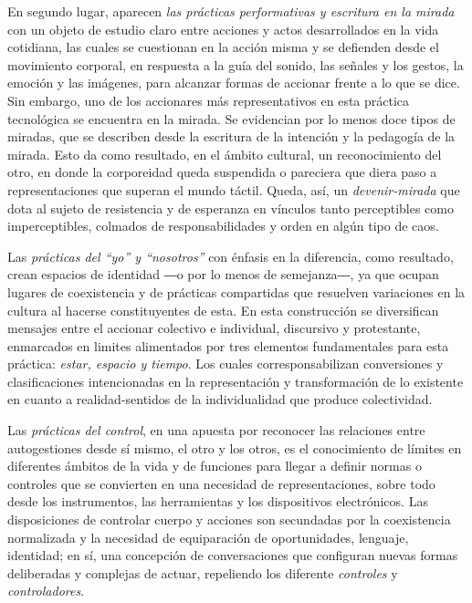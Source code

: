 \documentclass[spanish]{textolivre}
\begin{document}
En segundo lugar, aparecen \textit{las prácticas performativas y escritura en la mirada} con un objeto de estudio claro entre acciones y actos desarrollados en la vida cotidiana, las cuales se cuestionan en la acción misma y se defienden desde el movimiento corporal, en respuesta a la guía del sonido, las señales y los gestos, la emoción y las imágenes, para alcanzar formas de accionar frente a lo que se dice. Sin embargo, uno de los accionares más representativos en esta práctica tecnológica se encuentra en la mirada. Se evidencian por lo menos doce tipos de miradas, que se describen desde la escritura de la intención y la pedagogía de la mirada. Esto da como resultado, en el ámbito cultural, un reconocimiento del otro, en donde la corporeidad queda suspendida o pareciera que diera paso a representaciones que superan el mundo táctil. Queda, así, un \textit{devenir-mirada} que dota al sujeto de resistencia y de esperanza en vínculos tanto perceptibles como imperceptibles, colmados de responsabilidades y orden en algún tipo de caos.

Las \textit{prácticas del “yo” y “nosotros”} con énfasis en la diferencia, como resultado, crean espacios de identidad ―o por lo menos de semejanza―, ya que ocupan lugares de coexistencia y de prácticas compartidas que resuelven variaciones en la cultura al hacerse constituyentes de esta. En esta construcción se diversifican mensajes entre el accionar colectivo e individual, discursivo y protestante, enmarcados en limites alimentados por tres elementos fundamentales para esta práctica: \textit{estar, espacio y tiempo}. Los cuales corresponsabilizan conversiones y clasificaciones intencionadas en la representación y transformación de lo existente en cuanto a realidad-sentidos de la individualidad que produce colectividad.

Las \textit{prácticas del control}, en una apuesta por reconocer las relaciones entre autogestiones desde sí mismo, el otro y los otros, es el conocimiento de límites en diferentes ámbitos de la vida y de funciones para llegar a definir normas o controles que se convierten en una necesidad de representaciones, sobre todo desde los instrumentos, las herramientas y los dispositivos electrónicos. Las disposiciones de controlar cuerpo y acciones son secundadas por la coexistencia normalizada y la necesidad de equiparación de oportunidades, lenguaje, identidad; en sí, una concepción de conversaciones que configuran nuevas formas deliberadas y complejas de actuar, repeliendo los diferente \textit{controles} y \textit{controladores}.
\end{document}
